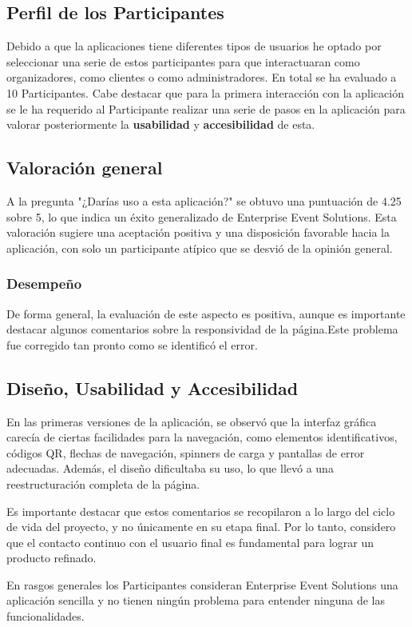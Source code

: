 \subsection{Perfil de los Participantes}
Debido a que la aplicaciones tiene diferentes tipos de usuarios he optado por seleccionar una serie de estos participantes para que interactuaran como organizadores,
como clientes o como administradores. En total se ha evaluado a 10 Participantes.
Cabe destacar que para la primera interacción con la aplicación se le ha requerido al Participante realizar una serie de pasos en la aplicación para 
valorar posteriormente la \textbf{usabilidad} y \textbf{accesibilidad} de esta.

\subsection{Valoración general}
A la pregunta "¿Darías uso a esta aplicación?" se obtuvo una puntuación de 4.25 sobre 5, lo que indica un éxito generalizado de Enterprise Event Solutions.
Esta valoración sugiere una aceptación positiva y una disposición favorable hacia la aplicación, con solo un participante atípico que se desvió de la opinión
general.

\subsubsection{Desempeño}

De forma general, la evaluación de este aspecto es positiva, aunque es importante destacar algunos comentarios sobre la responsividad de la página.Este problema
fue corregido tan pronto como se identificó el error.

\subsection{Diseño, Usabilidad y Accesibilidad}
En las primeras versiones de la aplicación, se observó que la interfaz gráfica carecía de ciertas facilidades para la navegación, como elementos
identificativos, códigos QR, flechas de navegación, spinners de carga y pantallas de error adecuadas. Además, el diseño dificultaba su uso, lo que llevó a una reestructuración completa de la página.

Es importante destacar que estos comentarios se recopilaron a lo largo del ciclo de vida del proyecto, y no únicamente en su etapa final.
Por lo tanto, considero que el contacto continuo con el usuario final es fundamental para lograr un producto refinado.


En rasgos generales los Participantes consideran Enterprise Event Solutions una aplicación sencilla y no tienen ningún problema para entender ninguna de las
funcionalidades.
